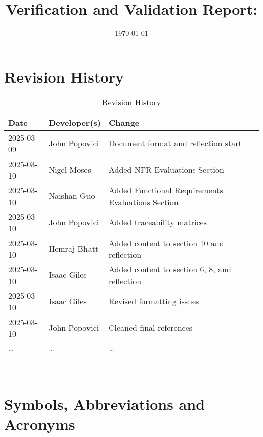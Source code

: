 \documentclass[12pt, titlepage]{article}
\begin{document}
\title{Verification and Validation Report: \progname} 
\author{\authname}
\date{\today}
	
\maketitle


\section{Revision History}

\begin{table}[hp]
\caption{Revision History} \label{TblRevisionHistory}
\begin{tabularx}{\textwidth}{llX}
\toprule
\textbf{Date} & \textbf{Developer(s)} & \textbf{Change}\\
\midrule
2025-03-09 & John Popovici & Document format and reflection start\\
2025-03-10 & Nigel Moses & Added NFR Evaluations Section\\
2025-03-10 & Naishan Guo & Added Functional Requirements Evaluations Section\\
2025-03-10 & John Popovici & Added traceability matrices\\
2025-03-10 & Hemraj Bhatt & Added content to section 10 and reflection\\
2025-03-10 & Isaac Giles & Added content to section 6, 8, and reflection\\
2025-03-10 & Isaac Giles & Revised formatting issues\\
2025-03-10 & John Popovici & Cleaned final references\\
\dots & \dots & \dots \\
\bottomrule
\end{tabularx}
\end{table}

~\newpage

\section{Symbols, Abbreviations and Acronyms}
\end{document}
